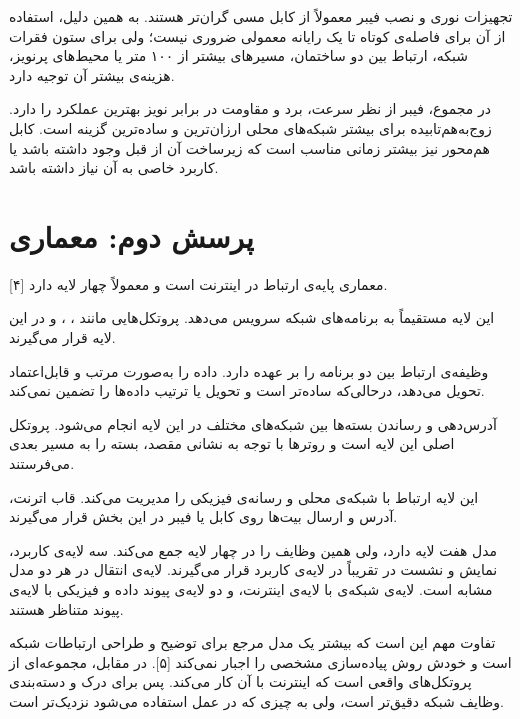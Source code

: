تجهیزات نوری و نصب فیبر معمولاً از کابل مسی گران‌تر هستند.
به همین دلیل، استفاده از آن برای فاصله‌ی کوتاه تا یک رایانه معمولی ضروری نیست؛
ولی برای ستون فقرات شبکه، ارتباط بین دو ساختمان، مسیرهای بیشتر از ۱۰۰ متر یا محیط‌های پرنویز، هزینه‌ی بیشتر آن توجیه دارد.

در مجموع، فیبر از نظر سرعت، برد و مقاومت در برابر نویز بهترین عملکرد را دارد.
زوج‌به‌هم‌تابیده برای بیشتر شبکه‌های محلی ارزان‌ترین و ساده‌ترین گزینه است.
کابل هم‌محور نیز بیشتر زمانی مناسب است که زیرساخت آن از قبل وجود داشته باشد یا کاربرد خاصی به آن نیاز داشته باشد.

\section{پرسش دوم: معماری }

معماری  پایه‌ی ارتباط در اینترنت است و معمولاً چهار لایه دارد [۴].


این لایه مستقیماً به برنامه‌های شبکه سرویس می‌دهد.
پروتکل‌هایی مانند ، ،  و  در این لایه قرار می‌گیرند.

وظیفه‌ی ارتباط بین دو برنامه را بر عهده دارد.
 داده را به‌صورت مرتب و قابل‌اعتماد تحویل می‌دهد، درحالی‌که  ساده‌تر است و تحویل یا ترتیب داده‌ها را تضمین نمی‌کند.

آدرس‌دهی و رساندن بسته‌ها بین شبکه‌های مختلف در این لایه انجام می‌شود.
پروتکل اصلی این لایه  است و روترها با توجه به نشانی مقصد، بسته را به مسیر بعدی می‌فرستند.

این لایه ارتباط با شبکه‌ی محلی و رسانه‌ی فیزیکی را مدیریت می‌کند.
قاب اترنت، آدرس  و ارسال بیت‌ها روی کابل یا فیبر در این بخش قرار می‌گیرند.


مدل  هفت لایه دارد، ولی  همین وظایف را در چهار لایه جمع می‌کند.
سه لایه‌ی کاربرد، نمایش و نشست در  تقریباً در لایه‌ی کاربرد  قرار می‌گیرند.
لایه‌ی انتقال در هر دو مدل مشابه است.
لایه‌ی شبکه‌ی  با لایه‌ی اینترنت، و دو لایه‌ی پیوند داده و فیزیکی با لایه‌ی پیوند  متناظر هستند.

تفاوت مهم این است که  بیشتر یک مدل مرجع برای توضیح و طراحی ارتباطات شبکه است و خودش روش پیاده‌سازی مشخصی را اجبار نمی‌کند [۵].
در مقابل،  مجموعه‌ای از پروتکل‌های واقعی است که اینترنت با آن کار می‌کند.
پس  برای درک و دسته‌بندی وظایف شبکه دقیق‌تر است، ولی  به چیزی که در عمل استفاده می‌شود نزدیک‌تر است.

